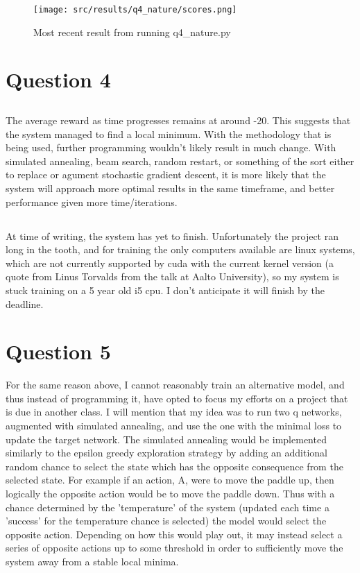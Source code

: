 \documentclass{article}
\begin{document}
\begin{figure}[h!]
	\centering
	\texttt{[image: src/results/q4\_nature/scores.png]}
	\caption{Most recent result from running q4\_nature.py}
\end{figure}

\section{Question 4}

\subsection{}
The average reward as time progresses remains at around -20. 
This suggests that the system managed to find a local minimum. 
With the methodology that is being used, further programming wouldn't likely 
result in much change. 
With simulated annealing, beam search, random restart, or something of the sort 
either to replace or agument stochastic gradient descent, it is more likely that
the system will approach more optimal results in the same timeframe, and better
performance given more time/iterations.


\subsection{}
At time of writing, the system has yet to finish. 
Unfortunately the project ran long in the tooth, and for training the only computers 
available are linux systems, which are not currently supported by cuda with the 
current kernel version (a quote from Linus Torvalds from the talk at Aalto
University), so my system is stuck training on a 5 year old i5 cpu. 
I don't anticipate it will finish by the deadline.


\section{Question 5}
For the same reason above, I cannot reasonably train an alternative model, and 
thus instead of programming it, have opted to focus my efforts on a project that 
is due in another class. 
I will mention that my idea was to run two q networks, augmented with simulated
annealing, and use the one with the minimal loss to update the target network.
The simulated annealing would be implemented similarly to the epsilon greedy
exploration strategy by adding an additional random chance to select the state 
which has the opposite consequence from the selected state. 
For example if an action, A, were to move the paddle up, then logically the opposite
action would be to move the paddle down. 
Thus with a chance determined by the 'temperature' of the system (updated each 
time a 'success' for the temperature chance is selected) the model would select
the opposite action. 
Depending on how this would play out, it may instead select a series of opposite actions
up to some threshold in order to sufficiently move the system away from a stable 
local minima. 
\end{document}
